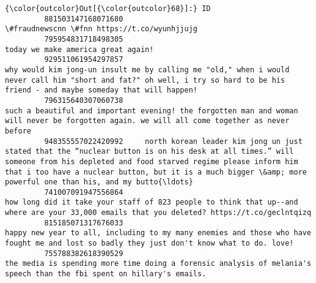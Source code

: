 \documentclass[11pt]{article}
\begin{document}
\begin{Verbatim}[commandchars=\\\{\}]
{\color{outcolor}Out[{\color{outcolor}68}]:} ID
         881503147168071680                                                                                                                                                                                                                                                  \#fraudnewscnn \#fnn https://t.co/wyunhjjujg
         795954831718498305                                                                                                                                                                                                                                                          today we make america great again!
         929511061954297857                                                                                                             why would kim jong-un insult me by calling me "old," when i would never call him "short and fat?" oh well, i try so hard to be his friend - and maybe someday that will happen!
         796315640307060738                                                                                                                                                such a beautiful and important evening! the forgotten man and woman will never be forgotten again. we will all come together as never before
         948355557022420992     north korean leader kim jong un just stated that the “nuclear button is on his desk at all times.” will someone from his depleted and food starved regime please inform him that i too have a nuclear button, but it is a much bigger \&amp; more powerful one than his, and my butto{\ldots}
         741007091947556864                                                                                                                                                  how long did it take your staff of 823 people to think that up--and where are your 33,000 emails that you deleted? https://t.co/geclntqizq
         815185071317676033                                                                                                                                                   happy new year to all, including to my many enemies and those who have fought me and lost so badly they just don't know what to do. love!
         755788382618390529                                                                                                                                                                       the media is spending more time doing a forensic analysis of melania's speech than the fbi spent on hillary's emails.

\end{Verbatim}
\end{document}
